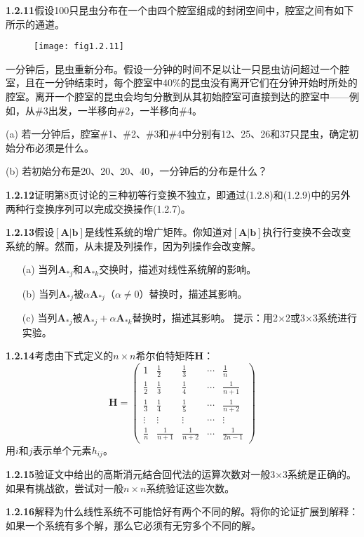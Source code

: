 \textbf{1.2.11}假设100只昆虫分布在一个由四个腔室组成的封闭空间中，腔室之间有如下所示的通道。

\begin{figure}[h]
	\centering
	\texttt{[image: fig1.2.11]} 
\end{figure}

一分钟后，昆虫重新分布。假设一分钟的时间不足以让一只昆虫访问超过一个腔室，且在一分钟结束时，每个腔室中40\%的昆虫没有离开它们在分钟开始时所处的腔室。离开一个腔室的昆虫会均匀分散到从其初始腔室可直接到达的腔室中——例如，从\#3出发，一半移向\#2，一半移向\#4。

(a) 若一分钟后，腔室\#1、\#2、\#3和\#4中分别有12、25、26和37只昆虫，确定初始分布必须是什么。

(b) 若初始分布是20、20、20、40，一分钟后的分布是什么？

\textbf{1.2.12}证明第8页讨论的三种初等行变换不独立，即通过(1.2.8)和(1.2.9)中的另外两种行变换序列可以完成交换操作(1.2.7)。

\textbf{1.2.13}假设\([\mathbf{A}|\mathbf{b}]\)是线性系统的增广矩阵。你知道对\([\mathbf{A}|\mathbf{b}]\)执行行变换不会改变系统的解。然而，从未提及列操作，因为列操作会改变解。
\begin{itemize}
	\item[(a)] 当列\(\mathbf{A}_{*j}\)和\(\mathbf{A}_{*k}\)交换时，描述对线性系统解的影响。
	\item[(b)] 当列\(\mathbf{A}_{*j}\)被\(\alpha\mathbf{A}_{*j}\)（\(\alpha \neq 0\)）替换时，描述其影响。
	\item[(c)] 当列\(\mathbf{A}_{*j}\)被\(\mathbf{A}_{*j} + \alpha\mathbf{A}_{*k}\)替换时，描述其影响。
	提示：用2×2或3×3系统进行实验。
\end{itemize}

\textbf{1.2.14}考虑由下式定义的\(n \times n\)希尔伯特矩阵\(\mathbf{H}\)：
\[
\mathbf{H} = \begin{pmatrix}
	1 & \frac{1}{2} & \frac{1}{3} & \cdots & \frac{1}{n} \\
	\frac{1}{2} & \frac{1}{3} & \frac{1}{4} & \cdots & \frac{1}{n+1} \\
	\frac{1}{3} & \frac{1}{4} & \frac{1}{5} & \cdots & \frac{1}{n+2} \\
	\vdots & \vdots & \vdots & \cdots & \vdots \\
	\frac{1}{n} & \frac{1}{n+1} & \frac{1}{n+2} & \cdots & \frac{1}{2n-1}
\end{pmatrix}
\]
用\(i\)和\(j\)表示单个元素\(h_{ij}\)。

\textbf{1.2.15}验证文中给出的高斯消元结合回代法的运算次数对一般3×3系统是正确的。如果有挑战欲，尝试对一般\(n \times n\)系统验证这些次数。

\textbf{1.2.16}解释为什么线性系统不可能恰好有两个不同的解。将你的论证扩展到解释：如果一个系统有多个解，那么它必须有无穷多个不同的解。























